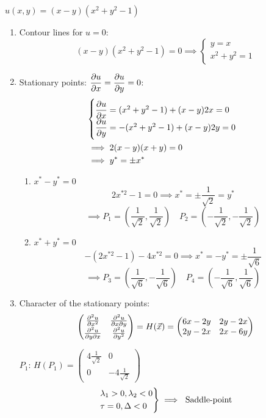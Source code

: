 \documentclass[10pt]{scrartcl}
\begin{document}
\begin{example}
$u(x,y) = (x-y)(x^2 + y^2 -1)$
\begin{enumerate}
\item Contour lines for $u= 0$:
\[(x-y)(x^2 + y^2 - 1) = 0 \implies\begin{cases}
y = x \\ x^2 + y^2 = 1	
\end{cases}
\]
\item Stationary points: $\dfrac{\partial u}{\partial x} = \dfrac{\partial u}{\partial y} = 0$:
\[
\begin{aligned}
&\begin{cases}
\dfrac{\partial u}{\partial x} = (x^2 + y^2 - 1) + (x-y)2x = 0\\
\dfrac{\partial u}{\partial y} = -(x^2 + y^2 -1) + (x-y)2y = 0	
\end{cases}\\
&\implies 2(x-y)(x+y) = 0\\
&\implies y^* = \pm x^*
\end{aligned}
\]
\begin{enumerate}
\item $x^* - y^* = 0$
\[2x^{*2} -1 = 0 \implies x^* = \pm \frac{1}{\sqrt{2}} = y^*\]
\[\implies P_1 = \left(\frac{1}{\sqrt{2}},\frac{1}{\sqrt{2}}\right) 
\quad P_2 = \left(-\frac{1}{\sqrt{2}},-\frac{1}{\sqrt{2}}\right)\]

\item $x^* + y^* = 0$
\[-(2x^{*2}-1) -4x^{*2} = 0\implies x^* = -y^* = \pm \frac{1}{\sqrt{6}}\]
\[\implies P_3 = \left(\frac{1}{\sqrt{6}},-\frac{1}{\sqrt{6}}\right) 
\quad P_4 = \left(-\frac{1}{\sqrt{6}},\frac{1}{\sqrt{6}}\right)\]
\end{enumerate}
\item Character of the stationary points:
\[\begin{pmatrix}
\frac{\partial^2u}{\partial x^2} & \frac{\partial^2u}{\partial x\partial y}\\
\frac{\partial^2u}{\partial y \partial x} & \frac{\partial^2u}{\partial y^2}	
\end{pmatrix}
= H(\vec{x}) = 
\begin{pmatrix}
6x - 2y & 2y - 2x\\
2y - 2x & 2x - 6y	
\end{pmatrix}
\]

$P_1$: 
$H(P_1) = \begin{pmatrix}
 4\frac{1}{\sqrt{2}}& 0 \\ 0 & -4\frac{1}{\sqrt{2}}	
 \end{pmatrix}
$
\[\begin{rcases*}
\lambda_1 > 0, \lambda_2 < 0 \\
\tau = 0, \Delta < 0	
\end{rcases*}\implies \text{ Saddle-point}
\]


\end{enumerate}
\end{example}
\end{document}
